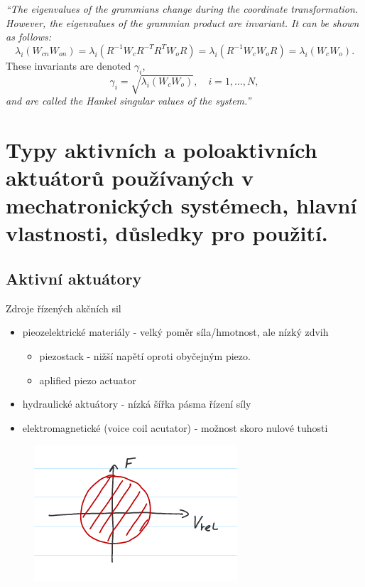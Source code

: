 \documentclass{article}
\begin{document}
	\emph{``The eigenvalues of the grammians change during the coordinate transformation. However, the eigenvalues of the grammian product are invariant. It can be shown as follows:}
	$$
	\lambda_{i}\left(W_{c n} W_{o n}\right)=\lambda_{i}\left(R^{-1} W_{c} R^{-T} R^{T} W_{o} R\right)=\lambda_{i}\left(R^{-1} W_{c} W_{o} R\right)=\lambda_{i}\left(W_{c} W_{o}\right) .
	$$
	These invariants are denoted $\gamma_{i}$,
	$$
	\gamma_{i}=\sqrt{\lambda_{i}\left(W_{c} W_{o}\right)}, \quad i=1, \ldots, N,
	$$
	\emph{and are called the Hankel singular values of the system.''}

	\section{Typy aktivních a poloaktivních aktuátorů používaných v mechatronických systémech, hlavní vlastnosti, důsledky pro použití.}

	\subsection{Aktivní aktuátory}
	Zdroje řízených akčních sil
	\begin{itemize}
		\item pieozelektrické materiály - velký poměr síla/hmotnost, ale nízký zdvih
			\begin{itemize}
			\item piezostack - nižší napětí oproti obyčejným piezo.
			\item aplified piezo actuator
			\end{itemize}
		\item hydraulické aktuátory - nízká šířka pásma řízení síly
		\item elektromagnetické (voice coil acutator) - možnost skoro nulové tuhosti
	\end{itemize}

	\begin{figure}[h!]
		\centering
		\includegraphics{figs/AktivniAktuator.png}
	\end{figure}
\end{document}
